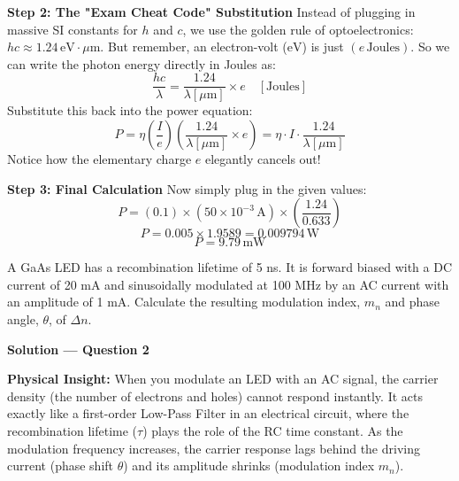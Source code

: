 \textbf{Step 2: The "Exam Cheat Code" Substitution}
Instead of plugging in massive SI constants for $h$ and $c$, we use the golden rule of optoelectronics: $hc \approx 1.24\,\text{eV}\cdot\mu\text{m}$. But remember, an electron-volt ($\text{eV}$) is just $(e\,\text{Joules})$. So we can write the photon energy directly in Joules as:
\begin{equation*}
  \frac{hc}{\lambda} = \frac{1.24}{\lambda[\mu\text{m}]} \times e \quad [\text{Joules}]
\end{equation*}
Substitute this back into the power equation:
\begin{equation*}
  P = \eta \left(\frac{I}{e}\right) \left( \frac{1.24}{\lambda[\mu\text{m}]} \times e \right) = \eta \cdot I \cdot \frac{1.24}{\lambda[\mu\text{m}]}
\end{equation*}
Notice how the elementary charge $e$ elegantly cancels out!

\textbf{Step 3: Final Calculation}
Now simply plug in the given values:
\begin{equation*}
  P = (0.1) \times (50 \times 10^{-3}\,\text{A}) \times \left( \frac{1.24}{0.633} \right)
\end{equation*}
\begin{equation*}
  P = 0.005 \times 1.9589 = 0.009794\,\text{W}
\end{equation*}
\begin{equation*}
  \boxed{P = 9.79\,\text{mW}}
\end{equation*}

\begin{question}[Question 2]
A GaAs LED has a recombination lifetime of 5 ns. It is forward biased with a DC current of 20 mA and sinusoidally modulated at 100 MHz by an AC current with an amplitude of 1 mA. Calculate the resulting modulation index, $m_n$ and phase angle, $\theta$, of $\Delta n$.
\end{question}

\textbf{\large Solution --- Question 2}

\textbf{Physical Insight:}
When you modulate an LED with an AC signal, the carrier density (the number of electrons and holes) cannot respond instantly. It acts exactly like a first-order Low-Pass Filter in an electrical circuit, where the recombination lifetime ($\tau$) plays the role of the RC time constant. As the modulation frequency increases, the carrier response lags behind the driving current (phase shift $\theta$) and its amplitude shrinks (modulation index $m_n$).

